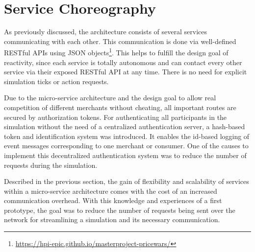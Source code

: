 %
\section{Service Choreography}
\label{sec:Choreography}
%
As previously discussed, the architecture consists of several services communicating with each other. This communication is done via well-defined RESTful APIs using JSON objects\footnote{\url{https://hpi-epic.github.io/masterproject-pricewars/}}. This helps to fulfill the design goal of reactivity, since each service is totally autonomous and can contact every other service via their exposed RESTful API at any time. There is no need for explicit simulation ticks or action requests.

Due to the micro-service architecture and the design goal to allow real competition of different merchants without cheating, all important routes are secured by authorization tokens. For authenticating all participants in the simulation without the need of a centralized authentication server, a hash-based token and identification system was introduced. It enables the id-based logging of event messages corresponding to one merchant or consumer. One of the causes to implement this decentralized authentication system was to reduce the number of requests during the simulation.

Described in the previous section, the gain of flexibility and scalability of services within a micro-service architecture comes with the cost of an increased communication overhead. With this knowledge and experiences of a first prototype, the goal was to reduce the number of requests being sent over the network for streamlining a simulation and its necessary communication. 


%
%

%
%


